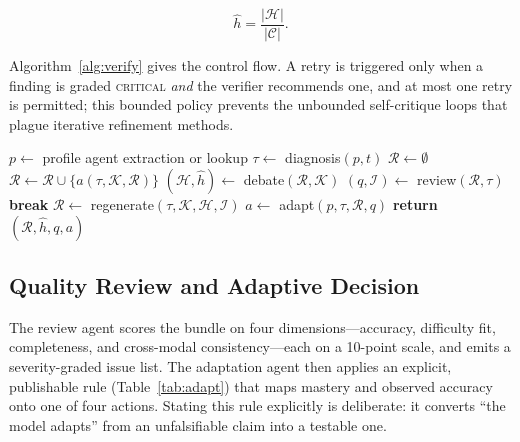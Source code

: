 \begin{equation}
\hat{h} = \frac{|\mathcal{H}|}{|\mathcal{C}|}.
\end{equation}

Algorithm~\ref{alg:verify} gives the control flow. A retry is triggered only
when a finding is graded \textsc{critical} \emph{and} the verifier recommends
one, and at most one retry is permitted; this bounded policy prevents the
unbounded self-critique loops that plague iterative refinement methods.

\begin{algorithm}[!t]
\caption{Verification-gated generation (per request)}
\label{alg:verify}
\begin{algorithmic}[1]
\STATE $p \leftarrow$ profile agent extraction or lookup
\STATE $\tau \leftarrow$ diagnosis$(p, t)$ 
\STATE $\mathcal{R} \leftarrow \emptyset$
  \STATE $\mathcal{R} \leftarrow \mathcal{R} \cup \{ a(\tau, \mathcal{K}, \mathcal{R}) \}$ 
\ENDFOR
{} 
  \STATE $(\mathcal{H}, \hat{h}) \leftarrow$ debate$(\mathcal{R}, \mathcal{K})$
  \STATE $(q, \mathcal{I}) \leftarrow$ review$(\mathcal{R}, \tau)$
    \STATE \textbf{break}
    \STATE $\mathcal{R} \leftarrow$ regenerate$(\tau, \mathcal{K}, \mathcal{H}, \mathcal{I})$
  \ENDIF
\ENDFOR
\STATE $a \leftarrow$ adapt$(p, \tau, \mathcal{R}, q)$ 
\STATE \textbf{return} $(\mathcal{R}, \hat{h}, q, a)$
\end{algorithmic}
\end{algorithm}

\subsection{Quality Review and Adaptive Decision}

The review agent scores the bundle on four dimensions---accuracy, difficulty
fit, completeness, and cross-modal consistency---each on a 10-point scale, and
emits a severity-graded issue list. The adaptation agent then applies an
explicit, publishable rule (Table~\ref{tab:adapt}) that maps mastery and
observed accuracy onto one of four actions. Stating this rule explicitly is
deliberate: it converts ``the model adapts'' from an unfalsifiable claim into a
testable one.

